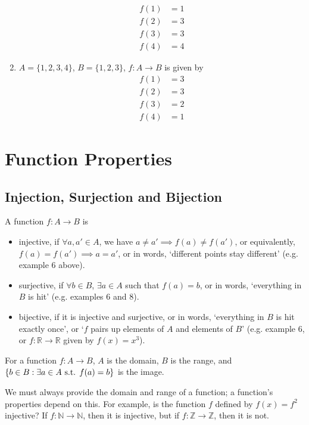 \documentclass{article}
\begin{document}
\begin{enumerate}
		\begin{align*}
			f(1) &= 1 \\
			f(2) &= 3 \\
			f(3) &= 3 \\
			f(4) &= 4
		\end{align*}
		\item $A = \{ 1, 2, 3, 4 \}$, $B = \{ 1, 2, 3 \}$, $f\colon A \to B$ is given by
		\begin{align*}
			f(1) &= 3 \\
			f(2) &= 3 \\
			f(3) &= 2 \\
			f(4) &= 1
		\end{align*}
	\end{enumerate}

	\section{Function Properties}
	\subsection{Injection, Surjection and Bijection}
	\begin{definition}
		A function $f\colon A \to B$ is
		\begin{itemize}
			\item injective, if $\forall a, a' \in A$, we have $a \neq a' \implies f(a) \neq f(a')$, or equivalently, $f(a) = f(a') \implies a = a'$, or in words, `different points stay different' (e.g. example 6 above).
			\item surjective, if $\forall b \in B$, $\exists a \in A$ such that $f(a) = b$, or in words, `everything in $B$ is hit' (e.g. examples 6 and 8).
			\item bijective, if it is injective and surjective, or in words, `everything in $B$ is hit exactly once', or `$f$ pairs up elements of $A$ and elements of $B$' (e.g. example 6, or $f\colon \mathbb R \to \mathbb R$ given by $f(x) = x^3$).
		\end{itemize}
	\end{definition}
	\begin{definition}
		For a function $f\colon A \to B$, $A$ is the domain, $B$ is the range, and $\{ b \in B : \exists a \in A \text{ s.t. } f(a) = b \}$ is the image.
	\end{definition}
	We must always provide the domain and range of a function; a function's properties depend on this. For example, is the function $f$ defined by $f(x) = f^2$ injective? If $f\colon \mathbb N \to \mathbb N$, then it is injective, but if $f\colon \mathbb Z \to \mathbb Z$, then it is not.
\end{document}
